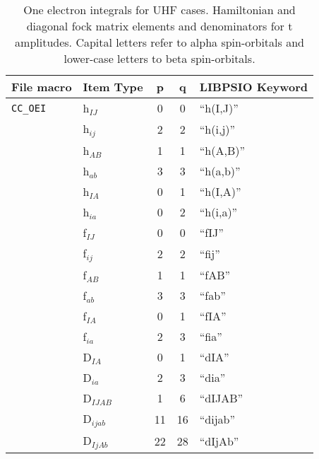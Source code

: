 \documentclass[12pt]{revtex4}
\begin{document}
\begin{table}
\squeezetable
\caption{One electron integrals for UHF cases.  Hamiltonian and diagonal 
fock matrix elements and denominators for t amplitudes. Capital letters refer 
to alpha spin-orbitals and lower-case letters to beta spin-orbitals.}
\begin{center}
\renewcommand{\arraystretch}{0.95}
\begin{tabular}{llccl}
File macro & Item Type & p & q & LIBPSIO Keyword \\
\hline
{\tt CC\_OEI} &h$_{IJ}$ &  0 &  0 & ``h(I,J)'' \\
              &h$_{ij}$ &  2 &  2 & ``h(i,j)'' \\
              &h$_{AB}$ &  1 &  1 & ``h(A,B)'' \\
              &h$_{ab}$ &  3 &  3 & ``h(a,b)'' \\
              &h$_{IA}$ &  0 &  1 & ``h(I,A)'' \\
              &h$_{ia}$ &  0 &  2 & ``h(i,a)'' \\
              &f$_{IJ}$ &  0 &  0 & ``fIJ'' \\
              &f$_{ij}$ &  2 &  2 & ``fij'' \\
              &f$_{AB}$ &  1 &  1 & ``fAB'' \\
              &f$_{ab}$ &  3 &  3 & ``fab'' \\
              &f$_{IA}$ &  0 &  1 & ``fIA'' \\
              &f$_{ia}$ &  2 &  3 & ``fia'' \\
              &D$_{IA}$ &  0 &  1 & ``dIA'' \\
              &D$_{ia}$ &  2 &  3 & ``dia'' \\
              &D$_{IJAB}$ &  1 &  6 & ``dIJAB'' \\
              &D$_{ijab}$ & 11 & 16 & ``dijab'' \\
              &D$_{IjAb}$ & 22 & 28 & ``dIjAb'' \\
\end{tabular}
\end{center}
\end{table}
\end{document}
